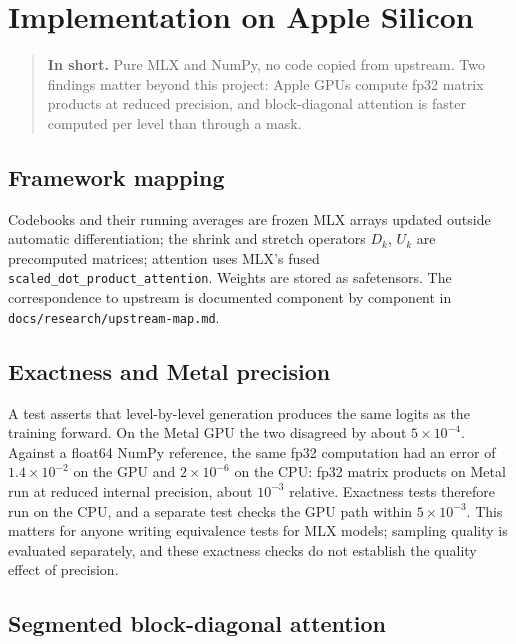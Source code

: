 \documentclass[
  british,
]{article}
\begin{document}
\section{Implementation on Apple
Silicon}\label{implementation-on-apple-silicon}

\begin{quote}
\textbf{In short.} Pure MLX and NumPy, no code copied from upstream. Two
findings matter beyond this project: Apple GPUs compute fp32 matrix
products at reduced precision, and block-diagonal attention is faster
computed per level than through a mask.
\end{quote}

\subsection{Framework mapping}\label{framework-mapping}

Codebooks and their running averages are frozen MLX arrays updated
outside automatic differentiation; the shrink and stretch operators
\(D_k\), \(U_k\) are precomputed matrices; attention uses MLX's fused
\texttt{scaled\_dot\_product\_attention}. Weights are stored as
safetensors. The correspondence to upstream is documented component by
component in \texttt{docs/research/upstream-map.md}.

\subsection{Exactness and Metal
precision}\label{exactness-and-metal-precision}

A test asserts that level-by-level generation produces the same logits
as the training forward. On the Metal GPU the two disagreed by about
\(5 \times 10^{-4}\). Against a float64 NumPy reference, the same fp32
computation had an error of \(1.4 \times 10^{-2}\) on the GPU and
\(2 \times 10^{-6}\) on the CPU: fp32 matrix products on Metal run at
reduced internal precision, about \(10^{-3}\) relative. Exactness tests
therefore run on the CPU, and a separate test checks the GPU path within
\(5 \times 10^{-3}\). This matters for anyone writing equivalence tests
for MLX models; sampling quality is evaluated separately, and these
exactness checks do not establish the quality effect of precision.

\subsection{Segmented block-diagonal
attention}\label{segmented-block-diagonal-attention}
\end{document}
